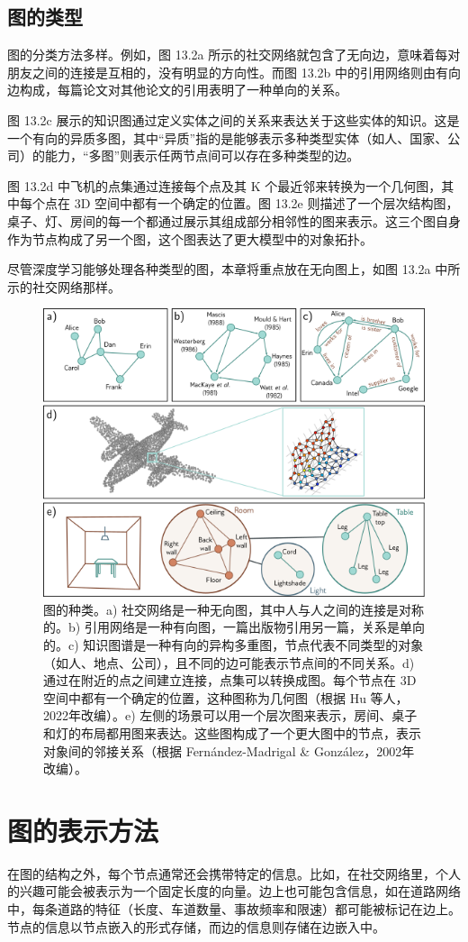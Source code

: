 \subsection{图的类型}
图的分类方法多样。例如，图 13.2a 所示的社交网络就包含了无向边，意味着每对朋友之间的连接是互相的，没有明显的方向性。而图 13.2b 中的引用网络则由有向边构成，每篇论文对其他论文的引用表明了一种单向的关系。

图 13.2c 展示的知识图通过定义实体之间的关系来表达关于这些实体的知识。这是一个有向的异质多图，其中“异质”指的是能够表示多种类型实体（如人、国家、公司）的能力，“多图”则表示任两节点间可以存在多种类型的边。

图 13.2d 中飞机的点集通过连接每个点及其 K 个最近邻来转换为一个几何图，其中每个点在 3D 空间中都有一个确定的位置。图 13.2e 则描述了一个层次结构图，桌子、灯、房间的每一个都通过展示其组成部分相邻性的图来表示。这三个图自身作为节点构成了另一个图，这个图表达了更大模型中的对象拓扑。

尽管深度学习能够处理各种类型的图，本章将重点放在无向图上，如图 13.2a 中所示的社交网络那样。

\begin{figure}[ht!]
\centering
\includegraphics[width=0.7\linewidth]{png/chapter13/GraphTypes.png}
\caption{图的种类。a) 社交网络是一种无向图，其中人与人之间的连接是对称的。b) 引用网络是一种有向图，一篇出版物引用另一篇，关系是单向的。c) 知识图谱是一种有向的异构多重图，节点代表不同类型的对象（如人、地点、公司），且不同的边可能表示节点间的不同关系。d) 通过在附近的点之间建立连接，点集可以转换成图。每个节点在 3D 空间中都有一个确定的位置，这种图称为几何图（根据 Hu 等人，2022年改编）。e) 左侧的场景可以用一个层次图来表示，房间、桌子和灯的布局都用图来表达。这些图构成了一个更大图中的节点，表示对象间的邻接关系（根据 Fernández-Madrigal \& González，2002年改编）。}
\end{figure}


\section{图的表示方法}
在图的结构之外，每个节点通常还会携带特定的信息。比如，在社交网络里，个人的兴趣可能会被表示为一个固定长度的向量。边上也可能包含信息，如在道路网络中，每条道路的特征（长度、车道数量、事故频率和限速）都可能被标记在边上。节点的信息以节点嵌入的形式存储，而边的信息则存储在边嵌入中。

